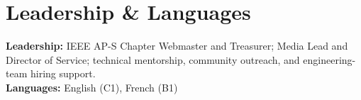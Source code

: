 \documentclass[letterpaper,11pt]{article}
\begin{document}
\section{Leadership \& Languages}
\textbf{Leadership:} IEEE AP-S Chapter Webmaster and Treasurer; Media Lead and Director of Service; technical mentorship, community outreach, and engineering-team hiring support. \\
\textbf{Languages:} English (C1), French (B1)
\end{document}
